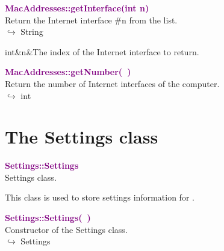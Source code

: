 
\textcolor{purple}{\textbf{MacAddresses::getInterface(int n)}}\label{MacAddresses::getInterface(int n)}\\
Return the Internet interface \#n from the list.\\ \hspace*{10mm}$\hookrightarrow$ String

\begin{tcolorbox}[width=\textwidth,myArgs,tabularx={ll|R}]
int&n&The index of the Internet interface to return.
\end{tcolorbox}


\textcolor{purple}{\textbf{MacAddresses::getNumber(~)}}\label{MacAddresses::getNumber()}\\
Return the number of Internet interfaces of the computer.\\ \hspace*{10mm}$\hookrightarrow$ int


\section{The Settings class}

\textcolor{purple}{\textbf{Settings::Settings}}\label{Settings::Settings}\\
Settings class.

This class is used to store settings information for \DynELA.



\textcolor{purple}{\textbf{Settings::Settings(~)}}\label{Settings::Settings()}\\
Constructor of the Settings class.\\ \hspace*{10mm}$\hookrightarrow$ Settings

